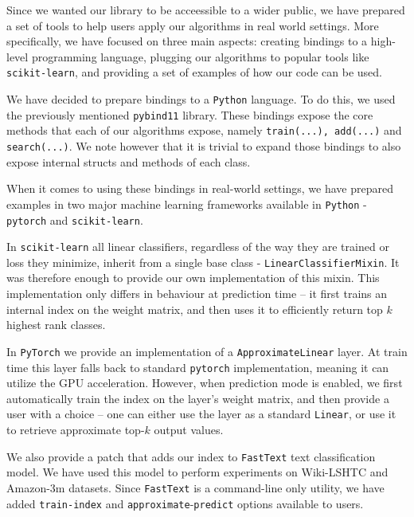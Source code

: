Since we wanted our library to be acceessible to a wider public, we have prepared
a set of tools to help users apply our algorithms in real world settings. More specifically,
we have focused on three main aspects: creating bindings to a high-level programming language,
plugging our algorithms to popular tools like \texttt{scikit-learn}, and providing a set
of examples of how our code can be used.

We have decided to prepare bindings to a \texttt{Python} language. To do this, we used
the previously mentioned \texttt{pybind11} library. These bindings expose the core methods that
each of our algorithms expose, namely \texttt{train(...), add(...)} and \texttt{search(...)}.
We note however that it is trivial to expand those bindings to also expose internal
structs and methods of each class.

When it comes to using these bindings in real-world settings, we have prepared examples
in two major machine learning frameworks available in \texttt{Python} - \texttt{pytorch}
and \texttt{scikit-learn}.

In \texttt{scikit-learn} all linear classifiers, regardless of the way they are trained
or loss they minimize, inherit from a single base class - \texttt{LinearClassifierMixin}.
It was therefore enough to provide our own implementation of this mixin. This implementation
only differs in behaviour at prediction time -- it first trains an internal index on the
weight matrix, and then uses it to efficiently return top $k$ highest rank classes.

In \texttt{PyTorch} we provide an implementation of a \texttt{ApproximateLinear} layer.
At train time this layer falls back to standard \texttt{pytorch} implementation, meaning
it can utilize the GPU acceleration. However, when prediction mode is enabled, we first
automatically train the index on the layer's weight matrix, and then provide a user with
a choice -- one can either use the layer as a standard \texttt{Linear}, or use it
to retrieve approximate top-$k$ output values.

We also provide a patch that adds our index to \texttt{FastText} text classification model.
We have used this model to perform experiments on Wiki-LSHTC and Amazon-3m datasets.
Since \texttt{FastText} is a command-line only utility, we have added \texttt{train-index}
and \texttt{approximate}-\texttt{predict} options available to users.
